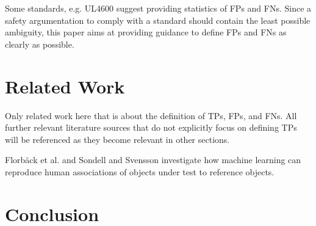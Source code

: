 \documentclass[conference]{IEEEtran}
\begin{document}
Some standards, e.g. UL4600 \cite[Sec. 8.4.1.2]{UL4600_voting_2019} suggest providing statistics of FPs and FNs. 
Since a safety argumentation to comply with a standard should contain the least possible ambiguity, this paper aims at providing guidance to define FPs and FNs as clearly as possible. 







\section{Related Work}
\label{sec:related_work}

Only related work here that is about the definition of TPs, FPs, and FNs. 
All further relevant literature sources that do not explicitly focus on defining TPs will be referenced as they become relevant in other sections. 

Florbäck et al. \cite{Florbaeck2016.matching.offline} and Sondell and Svensson \cite{Sondell2018} investigate how machine learning can reproduce human associations of objects under test to reference objects.


\section{Conclusion}
\label{sec:conclusion}



%
% 
% 
% 
% 
% 


{\small


}
\end{document}
